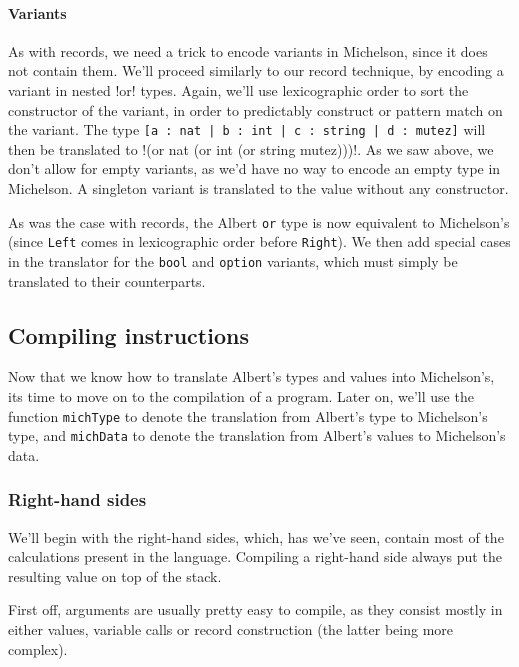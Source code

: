 \documentclass{report}
\begin{document}
\paragraph{Variants}

As with records, we need a trick to encode variants in Michelson, since it does not contain them. We'll proceed similarly to our record technique, by encoding a variant in nested !or! types. Again, we'll use lexicographic order to sort the constructor of the variant, in order to predictably construct or pattern match on the variant. The type \lstinline{[a : nat | b : int | c : string | d : mutez]} will then be translated to !(or nat (or int (or string mutez)))!. As we saw above, we don't allow for empty variants, as we'd have no way to encode an empty type in Michelson. A singleton variant is translated to the value without any constructor.

As was the case with records, the Albert \lstinline{or} type is now equivalent to Michelson's (since \lstinline{Left} comes in lexicographic order before \lstinline{Right}). We then add special cases in the translator for the \lstinline{bool} and \lstinline{option} variants, which must simply be translated to their counterparts.

\subsection{Compiling instructions}

Now that we know how to translate Albert's types and values into Michelson's, its time to move on to the compilation of a program. Later on, we'll use the function \texttt{michType} to denote the translation from Albert's type to Michelson's type, and \texttt{michData} to denote the translation from Albert's values to Michelson's data.

\subsubsection{Right-hand sides}

We'll begin with the right-hand sides, which, has we've seen, contain most of the calculations present in the language. Compiling a right-hand side always put the resulting value on top of the stack.

First off, arguments are usually pretty easy to compile, as they consist mostly in either values, variable calls or record construction (the latter being more complex).\\
\end{document}
